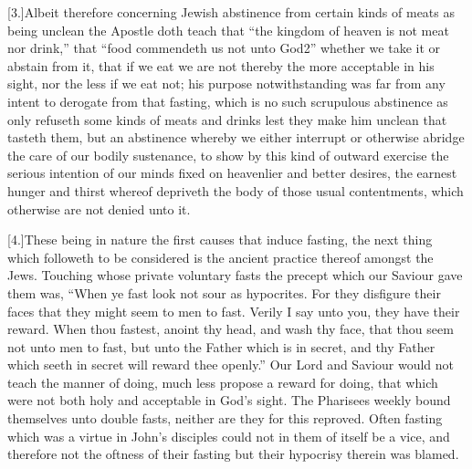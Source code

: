 [3.]Albeit therefore concerning Jewish abstinence from certain kinds of meats as being unclean the Apostle doth teach that “the kingdom of heaven is not meat nor drink,” that “food commendeth us not unto God2” whether we take it or abstain from it, that if we eat we are not thereby the more acceptable in his sight, nor the less if we eat not; his purpose notwithstanding was far from any intent to derogate from that fasting, which is no such scrupulous abstinence as only refuseth some kinds of meats and drinks lest they make him unclean that tasteth them, but an abstinence whereby we either interrupt or otherwise abridge the care of our bodily sustenance, to show by this kind of outward exercise the serious intention of our minds fixed on heavenlier and better desires, the earnest hunger and thirst whereof depriveth the body of those usual contentments, which otherwise are not denied unto it.

[4.]These being in nature the first causes that induce fasting, the next thing which followeth to be considered is the ancient practice thereof amongst the Jews. Touching whose private voluntary fasts the precept which our Saviour gave them was, “When ye fast look not sour as hypocrites.  For they disfigure their faces that they might seem to men to fast.
 Verily I say unto you, they have their reward. When thou fastest, anoint thy head, and wash thy face, that thou seem not unto men to fast, but unto the Father which is in secret, and thy Father which seeth in secret will reward thee openly.” Our Lord and Saviour would not teach the manner of doing, much less propose a reward for doing, that which were not both holy and acceptable in God’s sight. The Pharisees weekly bound themselves unto double fasts, neither are they for this reproved. Often fasting which was a virtue in John’s disciples could not in them of itself be a vice, and therefore not the oftness of their fasting but their hypocrisy therein was blamed.

